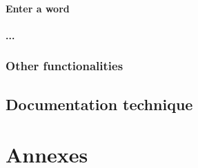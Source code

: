 \documentclass{tnreport}
\begin{document}
\subsection{Enter a word}

\subsection{...}

\section{Other functionalities}

\chapter{Documentation technique}

\appendix
\part*{Annexes}
\end{document}
